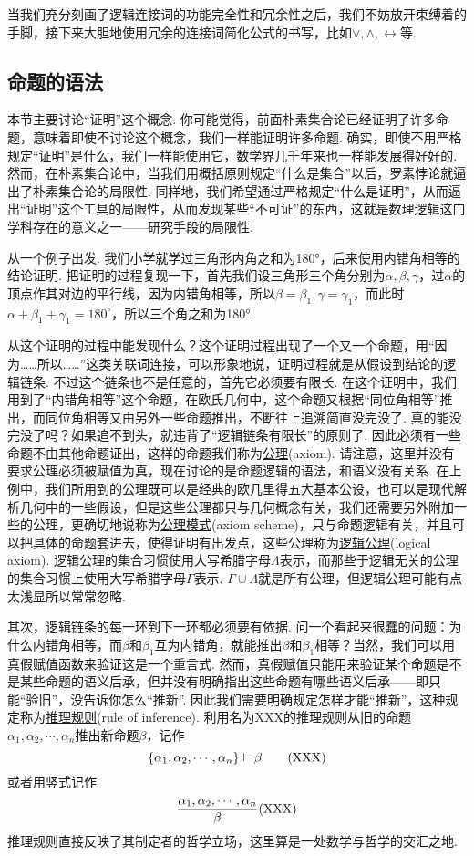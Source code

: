 \documentclass[main.tex]{subfiles}
\begin{document}
当我们充分刻画了逻辑连接词的功能完全性和冗余性之后，我们不妨放开束缚着的手脚，接下来大胆地使用冗余的连接词简化公式的书写，比如\(\vee, \wedge, \leftrightarrow\)等.

\subsection{命题的语法}

本节主要讨论“证明”这个概念. 你可能觉得，前面朴素集合论已经证明了许多命题，意味着即使不讨论这个概念，我们一样能证明许多命题. 确实，即使不用严格规定“证明”是什么，我们一样能使用它，数学界几千年来也一样能发展得好好的. 然而，在朴素集合论中，当我们用概括原则规定“什么是集合”以后，罗素悖论就逼出了朴素集合论的局限性. 同样地，我们希望通过严格规定“什么是证明”，从而逼出“证明”这个工具的局限性，从而发现某些“不可证”的东西，这就是数理逻辑这门学科存在的意义之一——研究手段的局限性.

从一个例子出发. 我们小学就学过三角形内角之和为180°，后来使用内错角相等的结论证明. 把证明的过程复现一下，首先我们设三角形三个角分别为\(\alpha, \beta, \gamma\)，过\(\alpha\)的顶点作其对边的平行线，因为内错角相等，所以\(\beta = \beta_1, \gamma = \gamma_1\)，而此时\(\alpha + \beta_1 + \gamma_1 = 180^\circ\)，所以三个角之和为180°.

从这个证明的过程中能发现什么？这个证明过程出现了一个又一个命题，用“因为……所以……”这类关联词连接，可以形象地说，证明过程就是从假设到结论的逻辑链条. 不过这个链条也不是任意的，首先它必须要有限长. 在这个证明中，我们用到了“内错角相等”这个命题，在欧氏几何中，这个命题又根据“同位角相等”推出，而同位角相等又由另外一些命题推出，不断往上追溯简直没完没了. 真的能没完没了吗？如果追不到头，就违背了“逻辑链条有限长”的原则了. 因此必须有一些命题不由其他命题证出，这样的命题我们称为\uline{公理}(axiom). 请注意，这里并没有要求公理必须被赋值为真，现在讨论的是命题逻辑的语法，和语义没有关系. 在上例中，我们所用到的公理既可以是经典的欧几里得五大基本公设，也可以是现代解析几何中的一些假设，但是这些公理都只与几何概念有关，我们还需要另外附加一些的公理，更确切地说称为\uline{公理模式}(axiom scheme)，只与命题逻辑有关，并且可以把具体的命题套进去，使得证明有出发点，这些公理称为\uline{逻辑公理}(logical axiom). 逻辑公理的集合习惯使用大写希腊字母\(\Lambda\)表示，而那些于逻辑无关的公理的集合习惯上使用大写希腊字母\(\Gamma\)表示. \(\Gamma \cup \Lambda\)就是所有公理，{\small 但逻辑公理可能有点太浅显所以常常忽略.}

其次，逻辑链条的每一环到下一环都必须要有依据. 问一个看起来很蠢的问题：为什么内错角相等，而\(\beta\)和\(\beta_1\)互为内错角，就能推出\(\beta\)和\(\beta_1\)相等？当然，我们可以用真假赋值函数来验证这是一个重言式. 然而，真假赋值只能用来验证某个命题是不是某些命题的语义后承，但并没有明确指出这些命题有哪些语义后承——即只能“验旧”，没告诉你怎么“推新”. 因此我们需要明确规定怎样才能“推新”，这种规定称为\uline{推理规则}(rule of inference). 利用名为XXX的推理规则从旧的命题\(\alpha_1, \alpha_2, \cdots, \alpha_n\)推出新命题\(\beta\)，记作
\[\{\alpha_1, \alpha_2, \cdots, \alpha_n\} \vdash \beta \qquad ({\rm XXX})\]
或者用竖式记作
\[{{\alpha_1, \alpha_2, \cdots, \alpha_n} \over {\beta}} ({\rm XXX})\]
推理规则直接反映了其制定者的哲学立场，这里算是一处数学与哲学的交汇之地.
\end{document}
